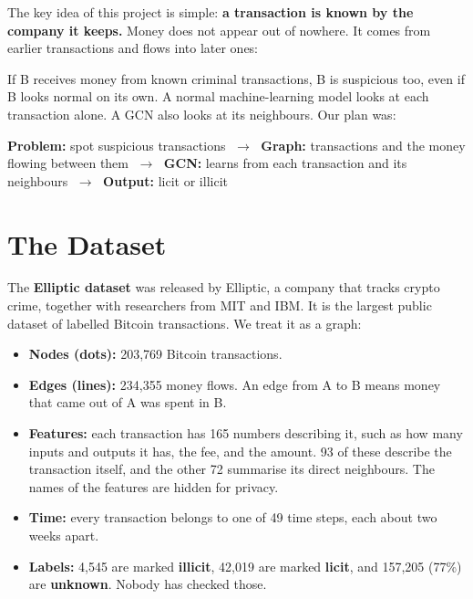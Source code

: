 \documentclass[11pt,a4paper]{article}
\begin{document}
The key idea of this project is simple: \textbf{a transaction is known by the company it keeps.} Money does not appear out of
nowhere. It comes from earlier transactions and flows into later ones:
\begin{center}
\end{center}
If B receives money from known criminal transactions, B is suspicious too, even if B looks normal on its own. A normal
machine-learning model looks at each transaction alone. A GCN also looks at its neighbours. Our plan was:
\begin{center}
\small
\textbf{Problem:} spot suspicious transactions $\;\rightarrow\;$
\textbf{Graph:} transactions and the money flowing between them $\;\rightarrow\;$
\textbf{GCN:} learns from each transaction and its neighbours $\;\rightarrow\;$
\textbf{Output:} licit or illicit
\end{center}

\section{The Dataset}
The \textbf{Elliptic dataset} \cite{weber} was released by Elliptic, a company that tracks crypto crime, together with
researchers from MIT and IBM. It is the largest public dataset of labelled Bitcoin transactions. We treat it as a graph:

\begin{itemize}
  \item \textbf{Nodes (dots):} 203,769 Bitcoin transactions.
  \item \textbf{Edges (lines):} 234,355 money flows. An edge from A to B means money that came out of A was spent in B.
  \item \textbf{Features:} each transaction has 165 numbers describing it, such as how many inputs and outputs it has, the fee,
        and the amount. 93 of these describe the transaction itself, and the other 72 summarise its direct neighbours.
        The names of the features are hidden for privacy.
  \item \textbf{Time:} every transaction belongs to one of 49 time steps, each about two weeks apart.
  \item \textbf{Labels:} 4,545 are marked \textcolor{illicit}{\textbf{illicit}}, 42,019 are marked \textcolor{licit}{\textbf{licit}},
        and 157,205 (77\%) are \textbf{unknown}. Nobody has checked those.
\end{itemize}
\end{document}
